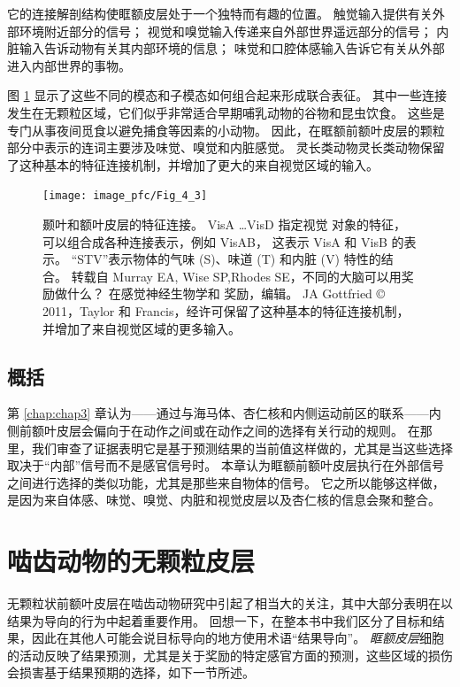 它的连接解剖结构使眶额皮层处于一个独特而有趣的位置。
触觉输入提供有关外部环境附近部分的信号；
视觉和嗅觉输入传递来自外部世界遥远部分的信号；
内脏输入告诉动物有关其内部环境的信息；
味觉和口腔体感输入告诉它有关从外部进入内部世界的事物。\par


图 \ref{fig:fig_4_3} 显示了这些不同的模态和子模态如何组合起来形成联合表征。
其中一些连接发生在无颗粒区域，它们似乎非常适合早期哺乳动物的谷物和昆虫饮食。
这些是专门从事夜间觅食以避免捕食等因素的小动物。
因此，在眶额前额叶皮层的颗粒部分中表示的连词主要涉及味觉、嗅觉和内脏感觉。
灵长类动物灵长类动物保留了这种基本的特征连接机制，并增加了更大的来自视觉区域的输入。\par


\begin{figure}[!htb]
	\centering
	\texttt{[image: image\_pfc/Fig\_4\_3]}
	\caption{颞叶和额叶皮层的特征连接。
		VisA …VisD 指定视觉
		对象的特征，可以组合成各种连接表示，例如 VisAB，
		这表示 VisA 和 VisB 的表示。 
		“STV”表示物体的气味 (S)、味道 (T) 和内脏 (V) 特性的结合。 转载自 Murray EA, Wise SP,Rhodes SE，不同的大脑可以用奖励做什么？ 
		在感觉神经生物学和
		奖励，编辑。 JA Gottfried © 2011，Taylor 和 Francis，经许可保留了这种基本的特征连接机制，并增加了来自视觉区域的更多输入。}\label{fig:fig_4_3}
\end{figure}



\subsection{概括}

第 \ref{chap:chap3} 章认为——通过与海马体、杏仁核和内侧运动前区的联系——内侧前额叶皮层会偏向于在动作之间或在动作之间的选择有关行动的规则。
在那里，我们审查了证据表明它是基于预测结果的当前值这样做的，尤其是当这些选择取决于“内部”信号而不是感官信号时。
本章认为眶额前额叶皮层执行在外部信号之间进行选择的类似功能，尤其是那些来自物体的信号。
它之所以能够这样做，是因为来自体感、味觉、嗅觉、内脏和视觉皮层以及杏仁核的信息会聚和整合。



\section{啮齿动物的无颗粒皮层}

无颗粒状前额叶皮层在啮齿动物研究中引起了相当大的关注，其中大部分表明在以结果为导向的行为中起着重要作用。
回想一下，在整本书中我们区分了目标和结果，因此在其他人可能会说目标导向的地方使用术语“结果导向”。
\textit{眶额皮层}细胞的活动反映了结果预测，尤其是关于奖励的特定感官方面的预测\cite{schoenbaum1998orbitofrontal}，这些区域的损伤会损害基于结果预期的选择，如下一节所述。



